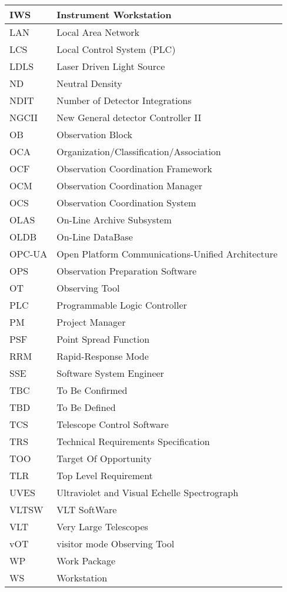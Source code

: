 \begin{longtable}{ |l|l| }
IWS & Instrument Workstation \\ \hline
LAN & Local Area Network \\ \hline
LCS & Local Control System (PLC) \\ \hline
LDLS & Laser Driven Light Source \\ \hline
ND & Neutral Density \\ \hline
NDIT & Number of Detector Integrations \\ \hline
NGCII & New General detector Controller II \\ \hline
OB & Observation Block \\ \hline
OCA & Organization/Classification/Association \\ \hline
OCF & Observation Coordination Framework \\ \hline
OCM & Observation Coordination Manager \\ \hline
OCS & Observation Coordination System \\ \hline
OLAS & On-Line Archive Subsystem \\ \hline
OLDB & On-Line DataBase \\ \hline
OPC-UA & Open Platform Communications-Unified Architecture \\ \hline
OPS & Observation Preparation Software \\ \hline
OT & Observing Tool \\ \hline
PLC & Programmable Logic Controller \\ \hline
PM & Project Manager \\ \hline
PSF & Point Spread Function \\ \hline
RRM & Rapid-Response Mode \\ \hline
SSE & Software System Engineer \\ \hline
TBC & To Be Confirmed \\ \hline
TBD & To Be Defined \\ \hline
TCS & Telescope Control Software \\ \hline
TRS & Technical Requirements Specification \\ \hline
TOO & Target Of Opportunity \\ \hline
TLR & Top Level Requirement \\ \hline
UVES & Ultraviolet and Visual Echelle Spectrograph \\ \hline
VLTSW & VLT SoftWare \\ \hline
VLT & Very Large Telescopes \\ \hline
vOT & visitor mode Observing Tool \\ \hline
WP & Work Package \\ \hline
WS & Workstation \\ \hline
\end{longtable}
